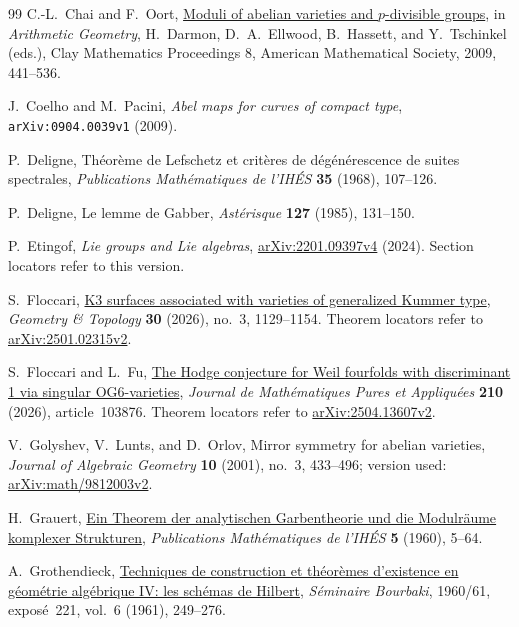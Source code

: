 \documentclass[11pt]{article}
\numberwithin{equation}{section}
\begin{document}
\begin{thebibliography}{99}
C.-L.~Chai and F.~Oort,
\href{https://www.claymath.org/wp-content/uploads/2022/03/cmip08c.pdf}{Moduli of abelian varieties and $p$-divisible groups},
in \emph{Arithmetic Geometry}, H.~Darmon, D.~A.~Ellwood, B.~Hassett,
and Y.~Tschinkel (eds.), Clay Mathematics Proceedings 8,
American Mathematical Society, 2009, 441--536.

J.~Coelho and M.~Pacini,
\emph{Abel maps for curves of compact type},
\texttt{arXiv:0904.0039v1} (2009).

P.~Deligne,
Th\'eor\`eme de Lefschetz et crit\`eres de d\'eg\'en\'erescence de suites spectrales,
\emph{Publications Math\'ematiques de l'IH\'ES} \textbf{35} (1968), 107--126.

P.~Deligne,
Le lemme de Gabber,
\emph{Ast\'erisque} \textbf{127} (1985), 131--150.

P.~Etingof,
\emph{Lie groups and Lie algebras},
\href{https://arxiv.org/abs/2201.09397v4}{arXiv:2201.09397v4} (2024).
Section locators refer to this version.

S.~Floccari,
\href{https://doi.org/10.2140/gt.2026.30.1129}{K3 surfaces associated with varieties of generalized Kummer type},
\emph{Geometry \& Topology} \textbf{30} (2026), no.~3, 1129--1154.
Theorem locators refer to
\href{https://arxiv.org/abs/2501.02315v2}{arXiv:2501.02315v2}.

S.~Floccari and L.~Fu,
\href{https://doi.org/10.1016/j.matpur.2026.103876}{The Hodge conjecture for Weil fourfolds with discriminant 1 via singular OG6-varieties},
\emph{Journal de Math\'ematiques Pures et Appliqu\'ees} \textbf{210} (2026), article~103876.
Theorem locators refer to
\href{https://arxiv.org/abs/2504.13607v2}{arXiv:2504.13607v2}.

V.~Golyshev, V.~Lunts, and D.~Orlov,
Mirror symmetry for abelian varieties,
\emph{Journal of Algebraic Geometry} \textbf{10} (2001), no.~3,
433--496; version used:
\href{https://arxiv.org/abs/math/9812003v2}{arXiv:math/9812003v2}.

H.~Grauert,
\href{https://www.numdam.org/article/PMIHES_1960__5__5_0.pdf}
{Ein Theorem der analytischen Garbentheorie und die Modulr\"aume
komplexer Strukturen},
\emph{Publications Math\'ematiques de l'IH\'ES} \textbf{5} (1960), 5--64.

A.~Grothendieck,
\href{https://www.numdam.org/article/SB_1960-1961__6__249_0.pdf}
{Techniques de construction et th\'eor\`emes d'existence en
g\'eom\'etrie alg\'ebrique IV: les sch\'emas de Hilbert},
\emph{S\'eminaire Bourbaki}, 1960/61, expos\'e~221,
vol.~6 (1961), 249--276.


\end{thebibliography}
\end{document}
